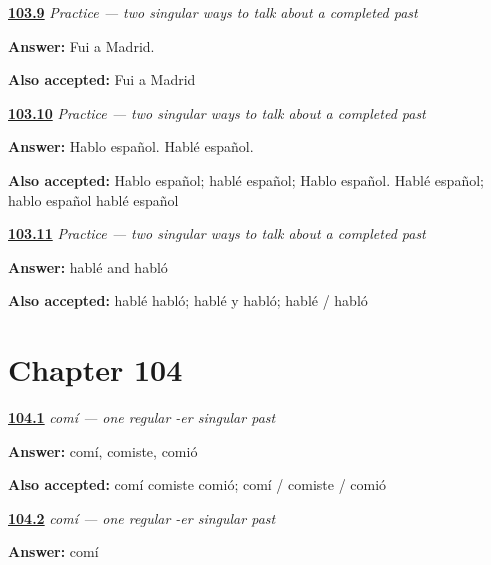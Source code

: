 \noindent\begin{minipage}[t]{\linewidth}
\raggedright
\hyperlink{review-ES-C14-practice-context-ser-ir}{\textbf{103.9}} \emph{Practice — two singular ways to talk about a completed past}\par
\small \textbf{Answer:} Fui a Madrid.\par
\footnotesize \textbf{Also accepted:} Fui a Madrid
\end{minipage}\par\medskip

\noindent\begin{minipage}[t]{\linewidth}
\raggedright
\hyperlink{review-ES-C14-practice-present-past}{\textbf{103.10}} \emph{Practice — two singular ways to talk about a completed past}\par
\small \textbf{Answer:} Hablo español. Hablé español.\par
\footnotesize \textbf{Also accepted:} Hablo español; hablé español; Hablo español. Hablé español; hablo español hablé español
\end{minipage}\par\medskip

\noindent\begin{minipage}[t]{\linewidth}
\raggedright
\hyperlink{review-ES-C14-practice-written-accents}{\textbf{103.11}} \emph{Practice — two singular ways to talk about a completed past}\par
\small \textbf{Answer:} hablé and habló\par
\footnotesize \textbf{Also accepted:} hablé habló; hablé y habló; hablé / habló
\end{minipage}\par\medskip

\section*{Chapter 104}

\noindent\begin{minipage}[t]{\linewidth}
\raggedright
\hyperlink{review-ES-C15-comer-preterite-singular-forms}{\textbf{104.1}} \emph{comí — one regular -er singular past}\par
\small \textbf{Answer:} comí, comiste, comió\par
\footnotesize \textbf{Also accepted:} comí comiste comió; comí / comiste / comió
\end{minipage}\par\medskip

\noindent\begin{minipage}[t]{\linewidth}
\raggedright
\hyperlink{review-ES-C15-comer-preterite-past-choice}{\textbf{104.2}} \emph{comí — one regular -er singular past}\par
\small \textbf{Answer:} comí\par
\end{minipage}\par\medskip

